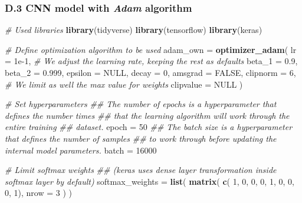 \documentclass[11pt,]{article}
\newenvironment{Shaded}{\begin{snugshade}}{\end{snugshade}}
\newcommand{\CommentTok}[1]{\textcolor[rgb]{0.56,0.35,0.01}{\textit{#1}}}
\newcommand{\DataTypeTok}[1]{\textcolor[rgb]{0.13,0.29,0.53}{#1}}
\newcommand{\DecValTok}[1]{\textcolor[rgb]{0.00,0.00,0.81}{#1}}
\newcommand{\FloatTok}[1]{\textcolor[rgb]{0.00,0.00,0.81}{#1}}
\newcommand{\KeywordTok}[1]{\textcolor[rgb]{0.13,0.29,0.53}{\textbf{#1}}}
\newcommand{\NormalTok}[1]{#1}
\newcommand{\OtherTok}[1]{\textcolor[rgb]{0.56,0.35,0.01}{#1}}
\newcommand{\StringTok}[1]{\textcolor[rgb]{0.31,0.60,0.02}{#1}}
\begin{document}
\hypertarget{d.3-cnn-model-with-adam-algorithm}{%
\subsubsection*{\texorpdfstring{D.3 CNN model with \emph{Adam}
algorithm}{D.3 CNN model with Adam algorithm}}\label{d.3-cnn-model-with-adam-algorithm}}

\begin{Shaded}
\begin{Highlighting}[]
\CommentTok{# Used libraries }
\KeywordTok{library}\NormalTok{(tidyverse)}
\KeywordTok{library}\NormalTok{(tensorflow)}
\KeywordTok{library}\NormalTok{(keras)}

\CommentTok{# Define optimization algorithm to be used}
\NormalTok{adam_own =}\StringTok{ }\KeywordTok{optimizer_adam}\NormalTok{(}
    \DataTypeTok{lr =} \FloatTok{1e-1}\NormalTok{, }\CommentTok{# We adjust the learning rate, keeping the rest as defaults}
    \DataTypeTok{beta_1 =} \FloatTok{0.9}\NormalTok{, }
    \DataTypeTok{beta_2 =} \FloatTok{0.999}\NormalTok{,}
    \DataTypeTok{epsilon =} \OtherTok{NULL}\NormalTok{, }
    \DataTypeTok{decay =} \DecValTok{0}\NormalTok{, }
    \DataTypeTok{amsgrad =} \OtherTok{FALSE}\NormalTok{, }
    \DataTypeTok{clipnorm =} \DecValTok{6}\NormalTok{, }\CommentTok{# We limit as well the max value for weights}
    \DataTypeTok{clipvalue =} \OtherTok{NULL}
\NormalTok{)}

\CommentTok{# Set hyperparameters }
\CommentTok{## The number of epochs is a hyperparameter that defines the number times }
\CommentTok{## that the learning algorithm will work through the entire training }
\CommentTok{## dataset.}
\NormalTok{epoch =}\StringTok{ }\DecValTok{50}
\CommentTok{## The batch size is a hyperparameter that defines the number of samples }
\CommentTok{## to work through before updating the internal model parameters.}
\NormalTok{batch =}\StringTok{ }\DecValTok{16000}

\CommentTok{# Limit softmax weights }
\CommentTok{## (keras uses dense layer transformation inside softmax layer by default)}
\NormalTok{softmax_weights =}\StringTok{ }\KeywordTok{list}\NormalTok{(}
    \KeywordTok{matrix}\NormalTok{(}
        \KeywordTok{c}\NormalTok{(  }\DecValTok{1}\NormalTok{,  }\DecValTok{0}\NormalTok{,  }\DecValTok{0}\NormalTok{,}
            \DecValTok{0}\NormalTok{,  }\DecValTok{1}\NormalTok{,  }\DecValTok{0}\NormalTok{,}
            \DecValTok{0}\NormalTok{,  }\DecValTok{0}\NormalTok{,  }\DecValTok{1}\NormalTok{), }
        \DataTypeTok{nrow =} \DecValTok{3}
\NormalTok{    )}
\NormalTok{)}


\end{Highlighting}
\end{Shaded}
\end{document}
